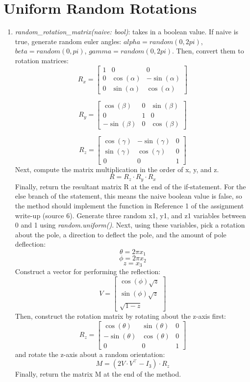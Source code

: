 \documentclass{article}
\begin{document}
\section{Uniform Random Rotations}
\begin{enumerate}
    \item \textit{random\_rotation\_matrix(naive: bool)}: takes in a boolean value. If naive is true, generate random euler angles: \(alpha = random(0, 2pi)\), \(beta = random(0, pi)\), \(gamma = random(0, 2pi)\). Then, convert them to rotation matrices:
\[
R_x = \begin{bmatrix}
1 & 0 & 0 \\
0 & \cos(\alpha) & -\sin(\alpha) \\
0 & \sin(\alpha) & \cos(\alpha)
\end{bmatrix}
\]

\[
R_y = \begin{bmatrix}
\cos(\beta) & 0 & \sin(\beta) \\
0 & 1 & 0 \\
-\sin(\beta) & 0 & \cos(\beta)
\end{bmatrix}
\]

\[
R_z = \begin{bmatrix}
\cos(\gamma) & -\sin(\gamma) & 0 \\
\sin(\gamma) & \cos(\gamma) & 0 \\
0 & 0 & 1
\end{bmatrix}
\]
Next, compute the matrix multiplication in the order of x, y, and z.
\[
R = R_z \cdot R_y \cdot R_x
\]
Finally, return the resultant matrix R at the end of the if-statement. For the else branch of the statement, this means the naive boolean value is false, so the method should implement the function in Reference 1 of the assignment write-up (source 6). Generate three random x1, y1, and z1 variables between 0 and 1 using \textit{random.uniform()}. Next, using these variables, pick a rotation about the pole, a direction to deflect the pole, and the amount of pole deflection:
\[
\theta = 2 \pi x_1
\]
\[
\phi = 2 \pi x_2
\]
\[
z = x_3
\]
Construct a vector for performing the reflection:
\[
V = \begin{bmatrix}
\cos(\phi) \sqrt{z} \\
\sin(\phi) \sqrt{z} \\
\sqrt{1 - z}
\end{bmatrix}
\]
Then, construct the rotation matrix by rotating about the z-axis first:
\[
R_z = \begin{bmatrix}
\cos(\theta) & \sin(\theta) & 0 \\
-\sin(\theta) & \cos(\theta) & 0 \\
0 & 0 & 1
\end{bmatrix}
\]
and rotate the z-axis about a random orientation:
\[
M = \left( 2 V \cdot V^\top - I_3 \right) \cdot R_z
\]
Finally, return the matrix M at the end of the method.



\end{enumerate}
\end{document}
